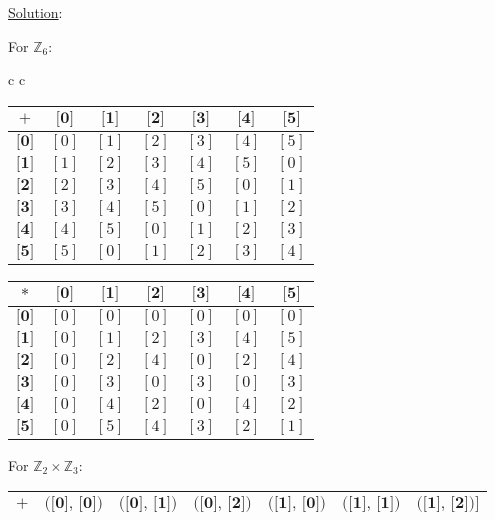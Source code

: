 \documentclass{article} %
\begin{document}
\underline{Solution}: 
\begin{addmargin}[1em]{0em}
For $\mathbb{Z}_6$: \\
\begin{tabular}{c c}
\begin{tabular}{|c | c | c | c | c | c | c|}
\hline
$+$ & $\textbf{[0]}$ & $\textbf{[1]}$ & $\textbf{[2]}$ & $\textbf{[3]}$ & $\textbf{[4]}$ & $\textbf{[5]}$\\ \hline
$\textbf{[0]}$ & $[0]$ & $[1]$ & $[2]$ & $[3]$ & $[4]$ & $[5]$\\ \hline
$\textbf{[1]}$ & $[1]$ & $[2]$ & $[3]$ & $[4]$ & $[5]$ & $[0]$\\ \hline
$\textbf{[2]}$ & $[2]$ & $[3]$ & $[4]$ & $[5]$ & $[0]$ & $[1]$\\ \hline
$\textbf{[3]}$ & $[3]$ & $[4]$ & $[5]$ & $[0]$ & $[1]$ & $[2]$\\ \hline
$\textbf{[4]}$ & $[4]$ & $[5]$ & $[0]$ & $[1]$ & $[2]$ & $[3]$\\ \hline
$\textbf{[5]}$ & $[5]$ & $[0]$ & $[1]$ & $[2]$ & $[3]$ & $[4]$\\
\hline
\end{tabular}
\begin{tabular}{|c | c | c | c | c | c | c|}
\hline
$*$ & $\textbf{[0]}$ & $\textbf{[1]}$ & $\textbf{[2]}$ & $\textbf{[3]}$ & $\textbf{[4]}$ & $\textbf{[5]}$\\ \hline
$\textbf{[0]}$ & $[0]$ & $[0]$ & $[0]$ & $[0]$ & $[0]$ & $[0]$\\ \hline
$\textbf{[1]}$ & $[0]$ & $[1]$ & $[2]$ & $[3]$ & $[4]$ & $[5]$\\ \hline
$\textbf{[2]}$ & $[0]$ & $[2]$ & $[4]$ & $[0]$ & $[2]$ & $[4]$\\ \hline
$\textbf{[3]}$ & $[0]$ & $[3]$ & $[0]$ & $[3]$ & $[0]$ & $[3]$\\ \hline
$\textbf{[4]}$ & $[0]$ & $[4]$ & $[2]$ & $[0]$ & $[4]$ & $[2]$\\ \hline
$\textbf{[5]}$ & $[0]$ & $[5]$ & $[4]$ & $[3]$ & $[2]$ & $[1]$\\
\hline
\end{tabular}
\end{tabular}
\hfill \break
For $\mathbb{Z}_2 \times \mathbb{Z}_3$: \\
\begin{tabular}{|c | c | c | c | c | c | c|}
\hline
$+$ & $\textbf{([0], [0])}$ & $\textbf{([0], [1])}$ & $\textbf{([0], [2])}$ & $\textbf{([1], [0])}$ & $\textbf{([1], [1])}$ & $\textbf{([1], [2])]}$\\ \hline

\end{tabular}
\end{addmargin}
\end{document}
